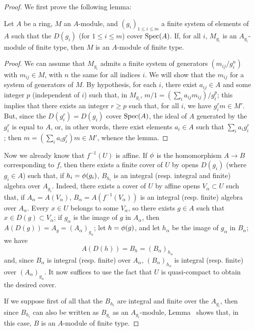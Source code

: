 \begin{proof}
We first prove the following lemma:

  \begin{lemma}[6.1.4.1]
  \label{II.6.1.4.1}
  Let $A$ be a ring, $M$ an $A$-module, and $(g_i)_{1\leq i\leq m}$ a finite system of elements of $A$ such that the $D(g_i)$ (for $1\leq i\leq m$) cover $\operatorname{Spec}(A)$.
  If, for all $i$, $M_{g_i}$ is an $A_{g_i}$-module of finite type, then $M$ is an $A$-module of finite type.
  \end{lemma}

  \begin{proof}
  We can assume that $M_{g_i}$ admits a finite system of generators $(m_{ij}/g_i^n)$ with $m_{ij}\in M$, with $n$ the same for all indices $i$.
  We will show that the $m_{ij}$ for a system of generators of $M$.
  By hypothesis, for each $i$, there exist $a_{ij}\in A$ and some integer $p$ (independent of $i$) such that, in $M_{g_i}$, $m/1=(\sum_i a_{ij}m_{ij})/g_i^p$;
  this implies that there exists an integer $r\geq p$ such that, for all $i$, we have $g_i^rm\in M'$.
  But, since the $D(g_i^r)=D(g_i)$ cover $\operatorname{Spec}(A)$, the ideal of $A$ generated by the $g_i^r$ is equal to $A$, or, in other words, there exist elements $a_i\in A$ such that $\sum_i a_ig_i^r$;
  then $m=(\sum_i a_i g_i^r)m\in M'$, whence the lemma.
  \end{proof}

Now we already know  that $f^{-1}(U)$ is affine.
If $\phi$ is the homomorphism $A\to B$ corresponding to $f$, then there exists a finite cover of $U$ by opens $D(g_i)$ (where $g_i\in A$) such that, if $h_i=\phi(g_i)$, $B_{h_i}$ is an integral (resp. integral and finite) algebra over $A_{g_i}$.
Indeed, there exists a cover of $U$ by affine opens $V_\alpha\subset U$ such that, if $A_\alpha=A(V_\alpha)$, $B_\alpha=A(f^{-1}(V_\alpha))$ is an integral (resp. finite) algebra over $A_\alpha$.
Every $x\in U$ belongs to some $V_\alpha$, so there exists $g\in A$ such that $x\in D(g)\subset V_\alpha$;
if $g_\alpha$ is the image of $g$ in $A_\alpha$, then $A(D(g))=A_g=(A_\alpha)_{g_\alpha}$;
let $h=\phi(g)$, and let $h_\alpha$ be the image of $g_\alpha$ in $B_\alpha$;
we have
\[
  A(D(h)) = B_h = (B_\alpha)_{h_\alpha}
\]
and, since $B_\alpha$ is integral (resp. finite) over $A_\alpha$, $(B_\alpha)_{h_\alpha}$ is integral (resp. finite) over $(A_\alpha)_{g_\alpha}$.
It now suffices to use the fact that $U$ is quasi-compact to obtain the desired cover.

If we suppose first of all that the $B_{h_i}$ are integral and finite over the $A_{g_i}$, then since $B_{h_i}$ can also be written as $B_{g_i}$ as an $A_{g_i}$-module, Lemma~ shows that, in this case, $B$ is an $A$-module of finite type.


\end{proof}
